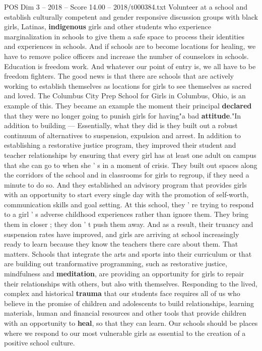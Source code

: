 \begin{textsample}{POS Dim 3 – 2018 – Score 14.00 – 2018/t000384.txt}
Volunteer at a school and establish culturally competent and gender responsive discussion groups with black girls, Latinas, \textbf{indigenous} girls and other students who experience marginalization in schools to give them a safe space to process their identities and experiences in schools.
And if schools are to become locations for healing, we have to remove police officers and increase the number of counselors in schools.
Education is freedom work.
And whatever our point of entry is, we all have to be freedom fighters.
The good news is that there are schools that are actively working to establish themselves as locations for girls to see themselves as sacred and loved.
The Columbus City Prep School for Girls in Columbus, Ohio, is an example of this.
They became an example the moment their principal \textbf{declared} that they were no longer going to punish girls for having"a bad \textbf{attitude}."In addition to building — Essentially, what they did is they built out a robust continuum of alternatives to suspension, expulsion and arrest.
In addition to establishing a restorative justice program, they improved their student and teacher relationships by ensuring that every girl has at least one adult on campus that she can go to when she ' s in a moment of crisis.
They built out spaces along the corridors of the school and in classrooms for girls to regroup, if they need a minute to do so.
And they established an advisory program that provides girls with an opportunity to start every single day with the promotion of self-worth, communication skills and goal setting.
At this school, they ' re trying to respond to a girl ' s adverse childhood experiences rather than ignore them.
They bring them in closer ; they don ' t push them away.
And as a result, their truancy and suspension rates have improved, and girls are arriving at school increasingly ready to learn because they know the teachers there care about them.
That matters.
Schools that integrate the arts and sports into their curriculum or that are building out tranformative programming, such as restorative justice, mindfulness and \textbf{meditation}, are providing an opportunity for girls to repair their relationships with others, but also with themselves.
Responding to the lived, complex and historical \textbf{trauma} that our students face requires all of us who believe in the promise of children and adolescents to build relationships, learning materials, human and financial resources and other tools that provide children with an opportunity to \textbf{heal}, so that they can learn.
Our schools should be places where we respond to our most vulnerable girls as essential to the creation of a positive school culture.

\end{textsample}
